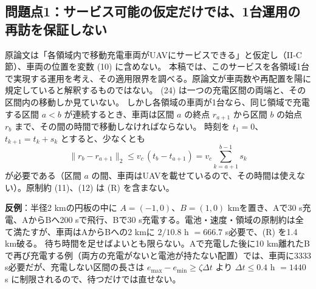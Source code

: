 \documentclass[uplatex,dvipdfmx,a4paper,11pt,jafont=haranoaji]{bxjsarticle}
\newcommand{\answerpart}[1]{\par\Needspace{6\baselineskip}\subsection*{#1}}
\newcommand{\norm}[1]{\lVert #1\rVert_2}
\begin{document}
\answerpart{問題点1：サービス可能の仮定だけでは、1台運用の再訪を保証しない}
原論文は「各領域内で移動充電車両がUAVにサービスできる」と仮定し（II-C節）、車両の位置を変数 (10) に含めない。
本稿では、このサービスを各領域1台で実現する運用を考え、その適用限界を調べる。原論文が車両数や再配置を陽に規定していると解釈するものではない。
(24) は一つの充電区間の両端と、その区間内の移動しか見ていない。
しかし各領域の車両が1台なら、同じ領域で充電する区間 $a<b$ が連続するとき、車両は区間 $a$ の終点 $r_{a+1}$ から区間 $b$ の始点 $r_b$ まで、その間の時間で移動しなければならない。
時刻を $t_1=0$、$t_{k+1}=t_k+s_k$ とすると、少なくとも
\begin{equation*}
  \norm{r_b-r_{a+1}}\le v_c\,(t_b-t_{a+1})=v_c\sum_{k=a+1}^{b-1}s_k \tag{R}
\end{equation*}
が必要である（区間 $a$ の間、車両はUAVを載せているので、その時間は使えない）。原制約 (11)、(12) は (R) を含まない。

\textbf{反例}：半径2 kmの円板の中に $A=(-1,0)$、$B=(1,0)$ kmを置き、Aで30 s充電、AからBへ200 sで飛行、Bで30 s充電する。電池・速度・領域の原制約は全て満たすが、車両はAからBへの2 kmに $2/10.8$ h $=666.7$ s必要で、(R) を1.4 km破る。
待ち時間を足せばよいとも限らない。Aで充電した後に10 km離れたBで再び充電する例（両方の充電がないと電池が持たない配置）では、車両に3333 s必要だが、充電しない区間の長さは $e_{\max}-e_{\min}\ge\zeta\Delta t$ より $\Delta t\le0.4$ h $=1440$ s に制限されるので、待つだけでは直せない。
\end{document}
